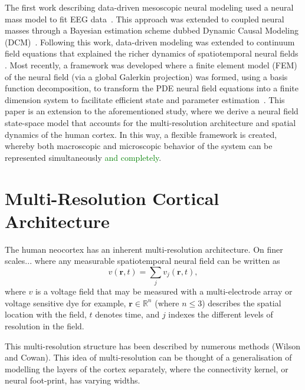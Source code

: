 \documentclass[11pt,draftcls,onecolumn,peerreview]{IEEEtran}
\newcommand{\dean}[1]{\textcolor{green}{#1}}
\begin{document}
The first work describing data-driven mesoscopic neural modeling used a neural mass model to fit EEG data~\cite{Valdes1999}. This approach was extended to coupled neural masses through a Bayesian estimation scheme dubbed Dynamic Causal Modeling (DCM)~\cite{David2003}. Following this work, data-driven modeling was extended to continuum field equations that explained the richer dynamics of spatiotemporal neural fields \cite{Galka2008,schiff2008kalman,Daunizeau2009}. Most recently, a framework was developed where a finite element model (FEM) of the neural field (via a global Galerkin projection) was formed, using a basis function decomposition, to transform the PDE neural field equations into a finite dimension system to facilitate efficient state and parameter estimation~\cite{Freestone2011}. This paper is an extension to the aforementioned study, where we derive a neural field state-space model that accounts for the multi-resolution architecture and spatial dynamics of the human cortex. In this way, a flexible framework is created, whereby both macroscopic and microscopic behavior of the system can be represented simultaneously \dean{and completely}.

\section{Multi-Resolution Cortical Architecture}
The human neocortex has an inherent multi-resolution architecture. On finer scales... where any measurable spatiotemporal neural field can be written as 
\begin{equation}
	v\left(\mathbf{r},t\right) = \sum_{j} v_j\left(\mathbf{r},t\right),
\end{equation}
where $v$ is a voltage field that may be measured with a multi-electrode array or voltage sensitive dye for example, $\mathbf{r}\in \mathbb{R}^n$ (where $n\le3$) describes the spatial location with the field, $t$ denotes time, and $j$ indexes the different levels of resolution in the field.

This multi-resolution structure has been described by numerous methods (Wilson and Cowan). This idea of multi-resolution can be thought of a generalisation of modelling the layers of the cortex separately, where the connectivity kernel, or neural foot-print, has varying widths.
\end{document}
